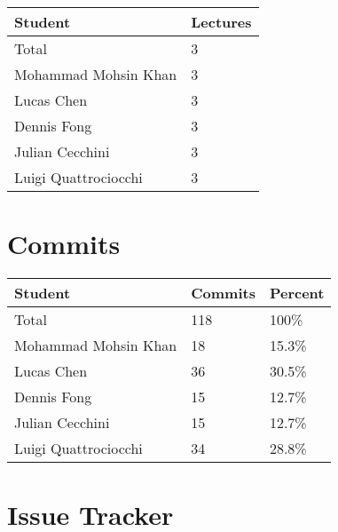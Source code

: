 \documentclass{article}
\begin{document}
\begin{table}[H]
\centering
\begin{tabular}{ll}
\toprule
\textbf{Student} & \textbf{Lectures}\\
\midrule
Total & 3\\
Mohammad Mohsin Khan & 3\\
Lucas Chen & 3\\
Dennis Fong & 3\\
Julian Cecchini & 3\\
Luigi Quattrociocchi & 3\\
\bottomrule
\end{tabular}
\end{table}

\section{Commits}


\begin{table}[H]
\centering
\begin{tabular}{lll}
\toprule
\textbf{Student} & \textbf{Commits} & \textbf{Percent}\\
\midrule
Total & 118 & 100\% \\
Mohammad Mohsin Khan & 18 & 15.3\% \\
Lucas Chen & 36 & 30.5\% \\
Dennis Fong & 15 & 12.7\% \\
Julian Cecchini & 15 & 12.7\% \\
Luigi Quattrociocchi & 34 & 28.8\% \\
\bottomrule
\end{tabular}
\end{table}


\section{Issue Tracker}
\end{document}
